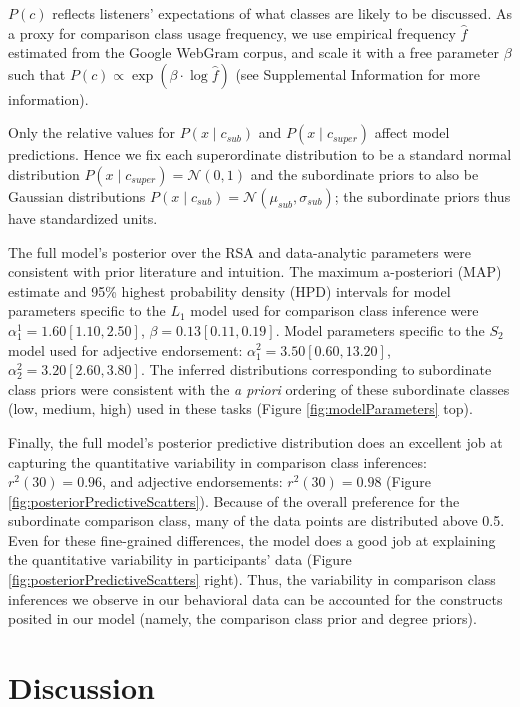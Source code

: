 \documentclass[doc]{apa6}
\begin{document}
\(P(c)\) reflects listeners' expectations of what classes are likely to be discussed. As a proxy for comparison class usage frequency, we use empirical frequency \(\hat{f}\) estimated from the Google WebGram corpus, and scale it with a free parameter $\beta$ such that $P(c) \propto \exp{(\beta \cdot \log \hat{f})}$ (see Supplemental Information for more information).

Only the relative values for \(P(x \mid c_{sub})\) and \(P(x \mid c_{super})\) affect model predictions. Hence we fix each superordinate distribution to be a standard normal distribution \(P(x \mid c_{super}) = \mathcal{N}(0, 1)\) and the subordinate priors to also be Gaussian distributions \(P(x \mid c_{sub}) = \mathcal{N}(\mu_{sub}, \sigma_{sub})\); the subordinate priors thus have standardized units.

The full model's posterior over the RSA and data-analytic parameters were consistent with prior literature and intuition. The maximum a-posteriori (MAP) estimate and 95\% highest probability density (HPD) intervals for model parameters specific to the \(L_1\) model used for comparison class inference were \(\alpha^{1}_{1} = 1.60 [1.10, 2.50]\), \(\beta = 0.13 [0.11, 0.19]\). Model parameters specific to the \(S_2\) model used for adjective endorsement: \(\alpha^{2}_{1} = 3.50 [0.60, 13.20]\), \(\alpha^{2}_{2} = 3.20 [2.60, 3.80]\). The inferred distributions corresponding to subordinate class priors were consistent with the \emph{a priori} ordering of these subordinate classes (low, medium, high) used in these tasks (Figure \ref{fig:modelParameters} top).

Finally, the full model's posterior predictive distribution does an excellent job at capturing the quantitative variability in comparison class inferences: \(r^2(30) = 0.96\), and adjective endorsements: \(r^2(30) = 0.98\) (Figure \ref{fig:posteriorPredictiveScatters}). Because of the overall preference for the subordinate comparison class, many of the data points are distributed above 0.5. Even for these fine-grained differences, the model does a good job at explaining the quantitative variability in participants' data (Figure \ref{fig:posteriorPredictiveScatters} right). Thus, the variability in comparison class inferences we observe in our behavioral data can be accounted for the constructs posited in our model (namely, the comparison class prior and degree priors).

\section{Discussion}
\end{document}

